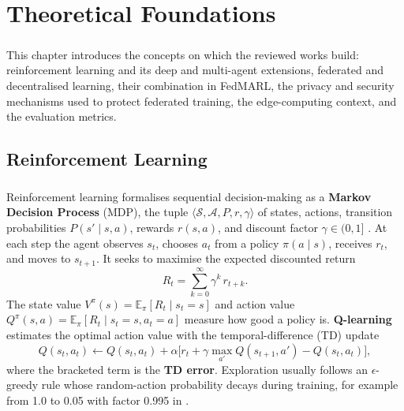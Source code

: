 \documentclass[12pt,a4paper,final]{extreport}
\begin{document}
\chapter{Theoretical Foundations}

\paragraph{} This chapter introduces the concepts on which the reviewed works build: reinforcement learning and its deep and multi-agent extensions, federated and decentralised learning, their combination in FedMARL, the privacy and security mechanisms used to protect federated training, the edge-computing context, and the evaluation metrics.

\section{Reinforcement Learning}

\paragraph{} Reinforcement learning formalises sequential decision-making as a \textbf{Markov Decision Process} (MDP), the tuple $\langle\mathcal{S},\mathcal{A},P,r,\gamma\rangle$ of states, actions, transition probabilities $P(s'\mid s,a)$, rewards $r(s,a)$, and discount factor $\gamma\in(0,1]$ \cite{p1}. At each step the agent observes $s_t$, chooses $a_t$ from a policy $\pi(a\mid s)$, receives $r_t$, and moves to $s_{t+1}$. It seeks to maximise the expected discounted return
\begin{equation}
R_t=\sum_{k=0}^{\infty}\gamma^{k}\,r_{t+k}.
\end{equation}
The state value $V^{\pi}(s)=\mathbb{E}_{\pi}[R_t\mid s_t=s]$ and action value $Q^{\pi}(s,a)=\mathbb{E}_{\pi}[R_t\mid s_t=s,a_t=a]$ measure how good a policy is. \textbf{Q-learning} estimates the optimal action value with the temporal-difference (TD) update
\begin{equation}
Q(s_t,a_t)\leftarrow Q(s_t,a_t)+\alpha\Big[r_t+\gamma\max_{a'}Q(s_{t+1},a')-Q(s_t,a_t)\Big],
\end{equation}
where the bracketed term is the \textbf{TD error}. Exploration usually follows an $\epsilon$-greedy rule whose random-action probability decays during training, for example from 1.0 to 0.05 with factor 0.995 in \cite{p2}.
\end{document}
